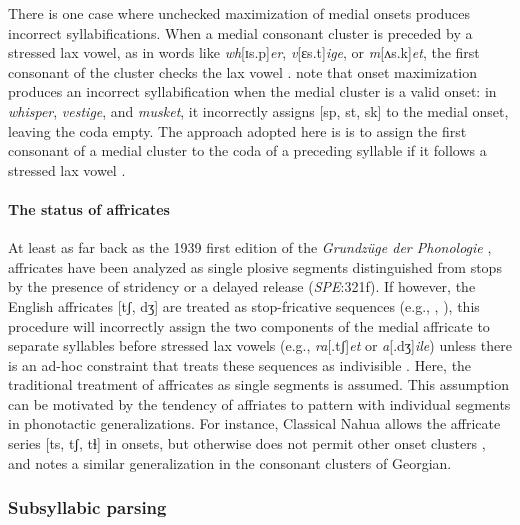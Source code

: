 There is one case where unchecked maximization of medial onsets produces incorrect syllabifications. When a medial consonant cluster is preceded by a stressed lax vowel, as in words like \emph{wh}[ɪs.p]\emph{er}, \emph{v}[ɛs.t]\emph{ige}, or \emph{m}[ʌs.k]\emph{et}, the first consonant of the cluster checks the lax vowel \citep[e.g.,][3]{Hammond1997}. \citet[][55]{Harris1994} note that onset maximization produces an incorrect syllabification when the medial cluster is a valid onset: in \emph{whisper}, \emph{vestige}, and \emph{musket}, it incorrectly assigns [sp, st, sk] to the medial onset, leaving the coda empty. The approach adopted here is is to assign the first consonant of a medial cluster to the coda of a preceding syllable if it follows a stressed lax vowel \citep[cf.][48]{Pulgram1970}.%

\paragraph{The status of affricates} At least as far back as the 1939 first edition of the \emph{Grundz{ü}ge der Phonologie} \citep{Trubetzkoy1958}, affricates have been analyzed as single plosive segments distinguished from stops by the presence of stridency \citep[24]{Jakobson1961} or a delayed release (\emph{SPE}:321f). If however, the English affricates [tʃ, dʒ] are treated as stop-fricative sequences (e.g., \citealt{Hualde1988}, \citealt{Lombardi1990}), this procedure will incorrectly assign the two components of the medial affricate to separate syllables before stressed lax vowels (e.g., \emph{ra}[.tʃ]\emph{et} or \emph{a}[.dʒ]\emph{ile}) unless there is an ad-hoc constraint that treats these sequences as indivisible \citep[e.g.,][]{Wells1990}. Here, the traditional treatment of affricates as single segments is assumed. This assumption can be motivated by the tendency of affriates to pattern with individual segments in phonotactic generalizations. For instance, Classical Nahua allows the affricate series [ts, tʃ, tɬ] in onsets, but otherwise does not permit other onset clusters \citep[9]{Launey2011}, and \citet[86]{Butskhrikidze2002} notes a similar generalization in the consonant clusters of Georgian.

\subsubsection{Subsyllabic parsing}

